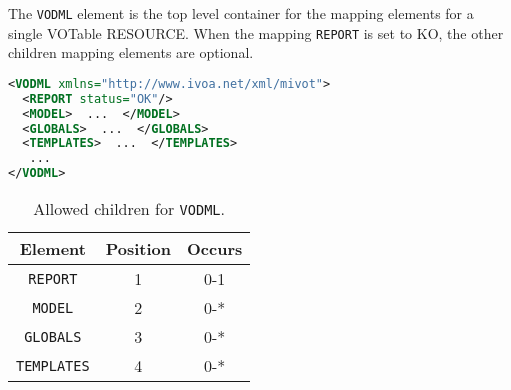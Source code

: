 The \texttt{VODML} element is the top level container for the mapping elements for a single VOTable RESOURCE.
When the mapping \texttt{REPORT} is set to KO, the other children mapping elements are optional.

\begin{lstlisting}[caption={Example \texttt{VODML} mapping block.},language=XML]
<VODML xmlns="http://www.ivoa.net/xml/mivot">
  <REPORT status="OK"/>
  <MODEL>  ...  </MODEL>
  <GLOBALS>  ...  </GLOBALS>
  <TEMPLATES>  ...  </TEMPLATES>
   ...
</VODML>
\end{lstlisting}

\begin{table}[!htbp]
  \small
  \centering
  \begin{tabulary}{\linewidth}{|c |c |c|}
    \hline 
        \textbf{Element} &
        \textbf{Position} &
        \textbf{Occurs}\\
    \hline
    \hline  
      \texttt{REPORT} &           
      1 &           
      0-1\\
    \hline  
      \texttt{MODEL} &           
      2 &           
      0-*\\
    \hline    
      \texttt{GLOBALS} &           
      3 &           
      0-*\\
    \hline  
      \texttt{TEMPLATES} &           
      4 &           
      0-*\\
    \hline 
  \end{tabulary}
    \caption{Allowed children for \texttt{VODML}.} 
    \label{tbl:vodml-children}
\end{table}


